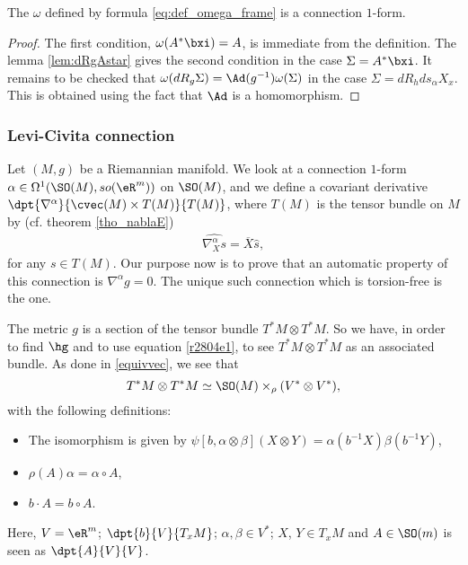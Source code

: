 \begin{proposition}
The $\omega$ defined by formula \eqref{eq:def_omega_frame} is a connection $1$-form.
\label{prop_omconfrom}
\end{proposition}

\begin{proof}
The first condition, $\omega(A^*\bxi)=A$, is immediate from the definition. The lemma \ref{lem:dRgAstar} gives the second condition in the case $\Sigma=A^*\bxi$. It remains to be checked that $\omega(dR_g\Sigma)=\Ad(g^{-1})\omega(\Sigma)$ in the case $\Sigma=dR_hds_{\alpha} X_x$. This is obtained using the fact that $\Ad$ is a homomorphism.
\end{proof}

\subsubsection{Levi-Civita connection}\label{subsubsec_levi}

Let $(M,g)$ be a Riemannian manifold. We look at a connection $1$-form $\alpha\in\Omega^1(\SO(M),so(\eR^m))$ on $\SO(M)$, and we define a covariant derivative $\dpt{\nabla^{\alpha}}{\cvec(M)\times T(M)}{T(M)}$, where $T(M)$ is the tensor bundle on $M$ by (cf. theorem \eqref{tho_nablaE})
\begin{eqnarray}\label{r2804e1}
 \widehat{\nabla^{\alpha}_X s}=\overline{X}\hat{s},
\end{eqnarray}
for any $s\in T(M)$.  Our purpose now is to prove that an automatic property of this connection is $\nabla^{\alpha} g=0$. The unique such connection which is torsion-free is the  one.

The metric $g$ is a section of the tensor bundle $T^*M\otimes T^*M$. So we have, in order to find $\hg$ and to use equation \eqref{r2804e1}, to see $T^*M\otimes T^*M$ as an associated bundle. As done in \ref{equivvec}, we see that
\[
 T^*M\otimes T^*M\simeq \SO(M)\times_{\rho}(V^*\otimes V^*),
\]
with the following definitions:
\begin{itemize}
\item The isomorphism is given by $\psi[b,\alpha\otimes\beta](X\otimes Y)=\alpha(b^{-1} X)\beta(b^{-1} Y)$,
\item $\rho(A)\alpha=\alpha\circ A$,
\item $b\cdot A=b\circ A$.
\end{itemize}
Here, $V=\eR^m$; $\dpt{b}{V}{T_xM}$; $\alpha,\beta\in V^*$; $X$, $Y\in T_xM$ and $A\in \SO(m)$ is seen as $\dpt{A}{V}{V}$.

